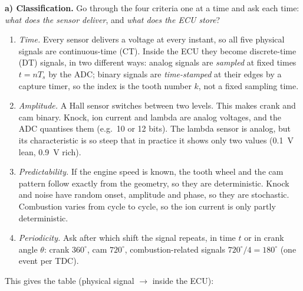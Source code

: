\begin{solution}
\textbf{a) Classification.} Go through the four criteria one at a time and
ask each time: \emph{what does the sensor deliver}, and \emph{what does the
ECU store}?
\begin{enumerate}[label=Step \arabic*:,leftmargin=*,itemsep=1pt]
  \item \emph{Time.} Every sensor delivers a voltage at every instant, so all
    five physical signals are continuous-time (CT). Inside the ECU they become
    discrete-time (DT) signals, in two different ways: analog signals are
    \emph{sampled} at fixed times $t=nT_s$ by the ADC; binary signals are
    \emph{time-stamped} at their edges by a capture timer, so the index is
    the tooth number $k$, not a fixed sampling time.
  \item \emph{Amplitude.} A Hall sensor switches between two levels. This
    makes crank and cam binary. Knock, ion current and lambda are analog
    voltages, and the ADC quantises them (e.g.\ 10 or 12 bits). The lambda
    sensor is analog, but its characteristic is so steep that in practice it
    shows only two values (\SI{0.1}{V} lean, \SI{0.9}{V} rich).
  \item \emph{Predictability.} If the engine speed is known, the tooth wheel
    and the cam pattern follow exactly from the geometry, so they are
    deterministic. Knock and noise have random onset, amplitude and phase, so
    they are stochastic. Combustion varies from cycle to cycle, so the ion
    current is only partly deterministic.
  \item \emph{Periodicity.} Ask after which shift the signal repeats, in time
    $t$ or in crank angle $\theta$: crank $360^\circ$, cam $720^\circ$,
    combustion-related signals $720^\circ/4=180^\circ$ (one event per TDC).
\end{enumerate}
This gives the table (physical signal $\to$ inside the ECU):


\end{solution}
